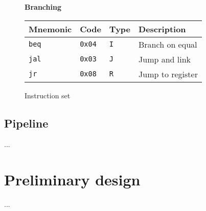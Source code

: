 \documentclass[11pt,twoside,a4paper]{article}
\begin{document}
\begin{figure}[H]
\begin{multicols}{2}
        \vspace{0.26in} %
        \textbf{Branching} \\
        \vspace{0.15in}
        \begin{tabular}{|l|l|l|l|}
                \hline
                \scriptsize {\bf Mnemonic} &
                \scriptsize {\bf Code} &
                \scriptsize {\bf Type} &
                \scriptsize {\bf Description} \\
                \hline {\tt beq} & {\tt 0x04} & {\tt I} & \scriptsize Branch on equal \\
                \hline {\tt jal} & {\tt 0x03} & {\tt J} & \scriptsize Jump and link \\
                \hline {\tt jr} & {\tt 0x08} & {\tt R} & \scriptsize Jump to register \\
                \hline
        \end{tabular}

        \end{multicols}
        \caption{Instruction set}
        \label{fig:instruction-set}
\end{figure}

\subsection{Pipeline}
...

\newpage
\pagestyle{fancy}
\section{Preliminary design}
...

\newpage
\pagestyle{fancy}
\end{document}
